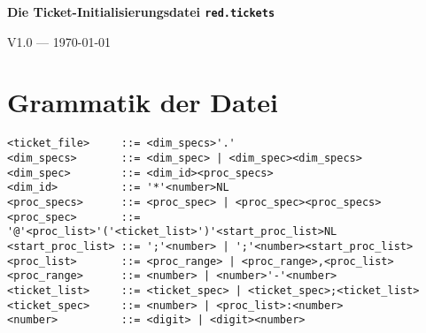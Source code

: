 
\centerline{\Large \bf Die Ticket-Initialisierungsdatei {\tt red.tickets}}
\centerline{\small V1.0 --- \today}
\section{Grammatik der Datei}
\begin{verbatim}
<ticket_file>     ::= <dim_specs>'.'
<dim_specs>       ::= <dim_spec> | <dim_spec><dim_specs>
<dim_spec>        ::= <dim_id><proc_specs>
<dim_id>          ::= '*'<number>NL
<proc_specs>      ::= <proc_spec> | <proc_spec><proc_specs>
<proc_spec>       ::= '@'<proc_list>'('<ticket_list>')'<start_proc_list>NL
<start_proc_list> ::= ';'<number> | ';'<number><start_proc_list>
<proc_list>       ::= <proc_range> | <proc_range>,<proc_list>
<proc_range>      ::= <number> | <number>'-'<number>
<ticket_list>     ::= <ticket_spec> | <ticket_spec>;<ticket_list>
<ticket_spec>     ::= <number> | <proc_list>:<number>
<number>          ::= <digit> | <digit><number>
\end{verbatim}
